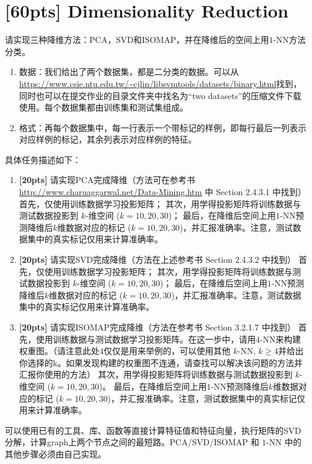 \documentclass[a4paper,UTF8]{article}
\numberwithin{equation}{section}
\begin{document}
\section{[60pts] Dimensionality Reduction}
请实现三种降维方法：PCA，SVD和ISOMAP，并在降维后的空间上用$1$-NN方法分类。
\begin{enumerate}
	\item 数据：我们给出了两个数据集，都是二分类的数据。可以从\url{https://www.csie.ntu.edu.tw/~cjlin/libsvmtools/datasets/binary.html}找到，同时也可以在提交作业的目录文件夹中找名为“two datasets”的压缩文件下载使用。每个数据集都由训练集和测试集组成。
	\item 格式：再每个数据集中，每一行表示一个带标记的样例，即每行最后一列表示对应样例的标记，其余列表示对应样例的特征。
\end{enumerate}

具体任务描述如下：
\begin{enumerate}
	\item \textbf{[20pts]} 请实现PCA完成降维（方法可在参考书\url{http://www.charuaggarwal.net/Data-Mining.htm} 中 Section 2.4.3.1 中找到）
	\subitem 首先，仅使用训练数据学习投影矩阵；
	\subitem 其次，用学得投影矩阵将训练数据与测试数据投影到 $k$-维空间 ($k=10,20,30$)；
	\subitem 最后，在降维后空间上用$1$-NN预测降维后$k$维数据对应的标记 ($k=10,20,30$)，并汇报准确率。注意，测试数据集中的真实标记仅用来计算准确率。
	\item \textbf{[20pts]} 请实现SVD完成降维（方法在上述参考书 Section 2.4.3.2 中找到）
	\subitem 首先，仅使用训练数据学习投影矩阵；
	\subitem 其次，用学得投影矩阵将训练数据与测试数据投影到 $k$-维空间 ($k=10,20,30$)；
	\subitem 最后，在降维后空间上用$1$-NN预测降维后$k$维数据对应的标记 ($k=10,20,30$)，并汇报准确率。注意，测试数据集中的真实标记仅用来计算准确率。
	\item \textbf{[20pts]} 请实现ISOMAP完成降维（方法在参考书 Section 3.2.1.7 中找到）
	\subitem 首先，使用训练数据与测试数据学习投影矩阵。在这一步中，请用$4$-NN来构建权重图。（请注意此处$4$仅仅是用来举例的，可以使用其他 $k$-NN, $k\geq 4$并给出你选择的k。如果发现构建的权重图不连通，请查找可以解决该问题的方法并汇报你使用的方法）
	\subitem 其次，用学得投影矩阵将训练数据与测试数据投影到 $k$-维空间 ($k=10,20,30$)。
	\subitem 最后，在降维后空间上用$1$-NN预测降维后$k$维数据对应的标记 ($k=10,20,30$)，并汇报准确率。注意，测试数据集中的真实标记仅用来计算准确率。
\end{enumerate}

可以使用已有的工具、库、函数等直接计算特征值和特征向量，执行矩阵的SVD分解，计算graph上两个节点之间的最短路。PCA/SVD/ISOMAP 和 $1$-NN 中的其他步骤必须由自己实现。
\end{document}
